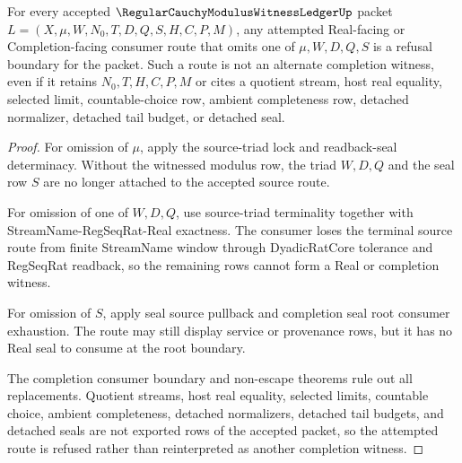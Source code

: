 \begin{theorem}
\label{thm:regular-cauchy-modulus-witness-ledger-completion-refusal-boundary}
For every accepted $\RegularCauchyModulusWitnessLedgerUp$ packet $L=(X,\mu,W,N_0,T,D,Q,S,H,C,P,M)$, any attempted Real-facing or Completion-facing consumer route that omits one of $\mu,W,D,Q,S$ is a refusal boundary for the packet. Such a route is not an alternate completion witness, even if it retains $N_0,T,H,C,P,M$ or cites a quotient stream, host real equality, selected limit, countable-choice row, ambient completeness row, detached normalizer, detached tail budget, or detached seal.
\end{theorem}
\begin{proof}
For omission of $\mu$, apply the source-triad lock and readback-seal determinacy. Without the witnessed modulus row, the triad $W,D,Q$ and the seal row $S$ are no longer attached to the accepted source route.

For omission of one of $W,D,Q$, use source-triad terminality together with StreamName-RegSeqRat-Real exactness. The consumer loses the terminal source route from finite StreamName window through DyadicRatCore tolerance and RegSeqRat readback, so the remaining rows cannot form a Real or completion witness.

For omission of $S$, apply seal source pullback and completion seal root consumer exhaustion. The route may still display service or provenance rows, but it has no Real seal to consume at the root boundary.

The completion consumer boundary and non-escape theorems rule out all replacements. Quotient streams, host real equality, selected limits, countable choice, ambient completeness, detached normalizers, detached tail budgets, and detached seals are not exported rows of the accepted packet, so the attempted route is refused rather than reinterpreted as another completion witness.
\end{proof}


